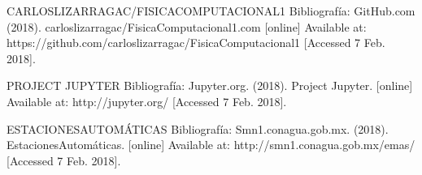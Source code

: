 \documentclass[12pt,letterpaper]{article}
\begin{document}
    
    
    CARLOSLIZARRAGAC/FISICACOMPUTACIONAL1
Bibliografía: GitHub.com (2018). carloslizarragac/FisicaComputacional1.com [online] Available at: https://github.com/carloslizarragac/FisicaComputacional1 [Accessed 7 Feb. 2018]. \par

PROJECT JUPYTER
Bibliografía: Jupyter.org. (2018). Project Jupyter. [online] Available at: http://jupyter.org/ [Accessed 7 Feb. 2018].\par

ESTACIONESAUTOMÁTICAS
Bibliografía: Smn1.conagua.gob.mx. (2018). EstacionesAutomáticas. [online] Available at: http://smn1.conagua.gob.mx/emas/ [Accessed 7 Feb. 2018].
    
    
    
\end{document}
